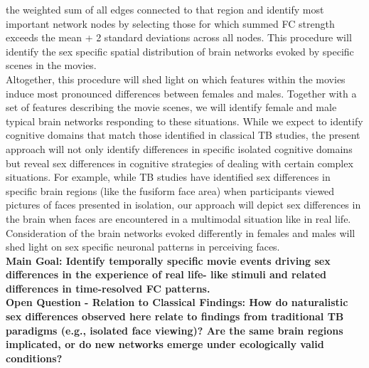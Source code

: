 \documentclass[11pt,a4paper]{article}
\begin{document}
the weighted sum of all edges connected to that region and identify most important network nodes by
selecting those for which summed FC strength exceeds the mean + 2 standard deviations across all nodes.
This procedure will identify the sex specific spatial distribution of brain networks evoked by specific scenes
in the movies.\\
Altogether, this procedure will shed light on which features within the movies induce most pronounced
differences between females and males. Together with a set of features describing the movie scenes, we
will identify female and male typical brain networks responding to these situations. While we expect to
identify cognitive domains that match those identified in classical TB studies, the present approach will not
only identify differences in specific isolated cognitive domains but reveal sex differences in cognitive
strategies of dealing with certain complex situations. For example, while TB studies have identified sex
differences in specific brain regions (like the fusiform face area) when participants viewed pictures of faces
presented in isolation, our approach will depict sex differences in the brain when faces are encountered in
a multimodal situation like in real life. Consideration of the brain networks evoked differently in females
and males will shed light on sex specific neuronal patterns in perceiving faces.\\
\textbf{Main Goal: Identify temporally specific movie events driving sex differences in the experience of real life-
like stimuli and related differences in time-resolved FC patterns.}\\
\textbf{Open Question - Relation to Classical Findings: How do naturalistic sex differences observed here relate
to findings from traditional TB paradigms (e.g., isolated face viewing)? Are the same brain regions
implicated, or do new networks emerge under ecologically valid conditions?}
\end{document}
